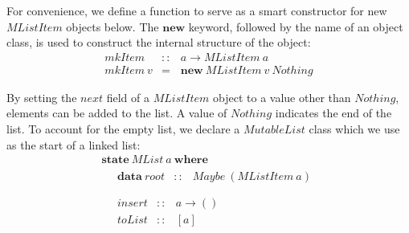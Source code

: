 \documentclass[runningheads,a4paper]{llncs}
\begin{document}
For convenience, we define a function to serve as a smart constructor for new $\mathit{MListItem}$ objects below. The $\mathbf{new}$ keyword, followed by the name of an object class, is used to construct the internal structure of the object:
\begin{displaymath}
\begin{array}{lcl}
\mathit{mkItem} & :: & a \to \mathit{MListItem}~a \\
\mathit{mkItem}~v & = & \mathbf{new}~\mathit{MListItem}~v~\mathit{Nothing}
\end{array}
\end{displaymath}

By setting the $\mathit{next}$ field of a $\mathit{MListItem}$ object to a value other than $\mathit{Nothing}$, elements can be added to the list. A value of $\mathit{Nothing}$ indicates the end of the list. To account for the empty list, we declare a $\mathit{MutableList}$ class which we use as the start of a linked list:
\begin{displaymath}
\begin{array}{l}
\mathbf{state}~\mathit{MList}~a~\mathbf{where} \\
\quad \begin{array}{lcl}
\mathbf{data}~\mathit{root}  & :: & \mathit{Maybe}~(\mathit{MListItem}~a)
\end{array}\\\\
\quad \begin{array}{lcl}
\mathit{insert} & :: & a \to () \\
\mathit{toList} & :: & [a]
\end{array}
\end{array}
\end{displaymath}
\end{document}
